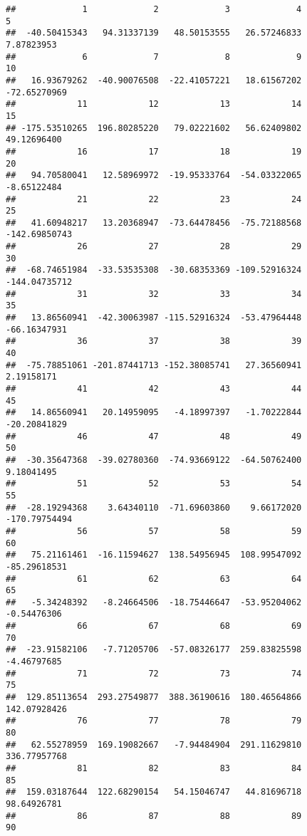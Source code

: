 \documentclass[
]{article}
\begin{document}
\begin{verbatim}
##             1             2             3             4             5 
##  -40.50415343   94.31337139   48.50153555   26.57246833    7.87823953 
##             6             7             8             9            10 
##   16.93679262  -40.90076508  -22.41057221   18.61567202  -72.65270969 
##            11            12            13            14            15 
## -175.53510265  196.80285220   79.02221602   56.62409802   49.12696400 
##            16            17            18            19            20 
##   94.70580041   12.58969972  -19.95333764  -54.03322065   -8.65122484 
##            21            22            23            24            25 
##   41.60948217   13.20368947  -73.64478456  -75.72188568 -142.69850743 
##            26            27            28            29            30 
##  -68.74651984  -33.53535308  -30.68353369 -109.52916324 -144.04735712 
##            31            32            33            34            35 
##   13.86560941  -42.30063987 -115.52916324  -53.47964448  -66.16347931 
##            36            37            38            39            40 
##  -75.78851061 -201.87441713 -152.38085741   27.36560941    2.19158171 
##            41            42            43            44            45 
##   14.86560941   20.14959095   -4.18997397   -1.70222844  -20.20841829 
##            46            47            48            49            50 
##  -30.35647368  -39.02780360  -74.93669122  -64.50762400    9.18041495 
##            51            52            53            54            55 
##  -28.19294368    3.64340110  -71.69603860    9.66172020 -170.79754494 
##            56            57            58            59            60 
##   75.21161461  -16.11594627  138.54956945  108.99547092  -85.29618531 
##            61            62            63            64            65 
##   -5.34248392   -8.24664506  -18.75446647  -53.95204062   -0.54476306 
##            66            67            68            69            70 
##  -23.91582106   -7.71205706  -57.08326177  259.83825598   -4.46797685 
##            71            72            73            74            75 
##  129.85113654  293.27549877  388.36190616  180.46564866  142.07928426 
##            76            77            78            79            80 
##   62.55278959  169.19082667   -7.94484904  291.11629810  336.77957768 
##            81            82            83            84            85 
##  159.03187644  122.68290154   54.15046747   44.81696718   98.64926781 
##            86            87            88            89            90 

\end{verbatim}
\end{document}
